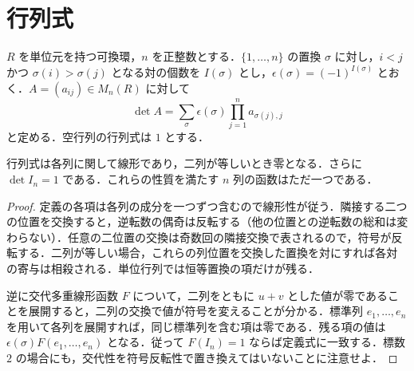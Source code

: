 \section{行列式}
\begin{defn}[行列式]
$R$ を単位元を持つ可換環，$n$ を正整数とする．$\{1,\ldots,n\}$ の置換 $\sigma$ に対し，$i<j$ かつ $\sigma(i)>\sigma(j)$ となる対の個数を $I(\sigma)$ とし，$\epsilon(\sigma)=(-1)^{I(\sigma)}$ とおく．$A=(a_{ij})\in M_n(R)$ に対して
\[
 \det A=\sum_{\sigma}\epsilon(\sigma)\prod_{j=1}^n a_{\sigma(j),j}
\]
と定める．空行列の行列式は $1$ とする．
\end{defn}
\begin{prop}[交代多重線形性]
行列式は各列に関して線形であり，二列が等しいとき零となる．さらに $\det I_n=1$ である．これらの性質を満たす $n$ 列の函数はただ一つである．
\end{prop}
\begin{proof}
定義の各項は各列の成分を一つずつ含むので線形性が従う．隣接する二つの位置を交換すると，逆転数の偶奇は反転する（他の位置との逆転数の総和は変わらない）．任意の二位置の交換は奇数回の隣接交換で表されるので，符号が反転する．二列が等しい場合，これらの列位置を交換した置換を対にすれば各対の寄与は相殺される．単位行列では恒等置換の項だけが残る．

逆に交代多重線形函数 $F$ について，二列をともに $u+v$ とした値が零であることを展開すると，二列の交換で値が符号を変えることが分かる．標準列 $e_1,\ldots,e_n$ を用いて各列を展開すれば，同じ標準列を含む項は零である．残る項の値は $\epsilon(\sigma)F(e_1,\ldots,e_n)$ となる．従って $F(I_n)=1$ ならば定義式に一致する．標数 $2$ の場合にも，交代性を符号反転性で置き換えてはいないことに注意せよ．
\end{proof}
